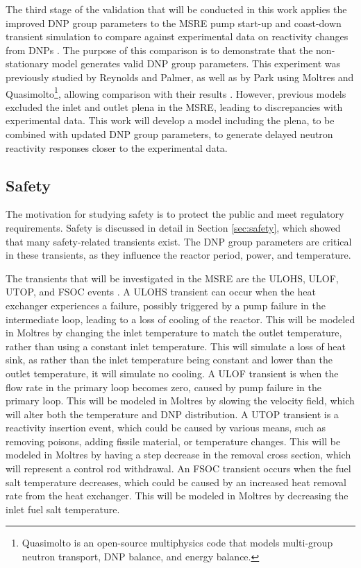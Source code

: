 The third stage of the validation that will be conducted in this work applies the improved \gls{DNP} group parameters to the \gls{MSRE} pump start-up and coast-down transient simulation to compare against experimental data on reactivity changes from \glspl{DNP} \cite{prince1968zero}.
The purpose of this comparison is to demonstrate that the non-stationary model generates valid \gls{DNP} group parameters.
This experiment was previously studied by Reynolds and Palmer, as well as by Park using Moltres and Quasimolto\footnote{Quasimolto is an open-source multiphysics code that models multi-group neutron transport, \gls{DNP} balance, and energy balance.}, allowing comparison with their results \cite{reynolds2023analysis, park_advancements_2025}.
However, previous models excluded the inlet and outlet plena in the \gls{MSRE}, leading to discrepancies with experimental data.
This work will develop a model including the plena, to be combined with updated \gls{DNP} group parameters, to generate delayed neutron reactivity responses closer to the experimental data.


\subsection{Safety}
The motivation for studying safety is to protect the public and meet regulatory requirements.
Safety is discussed in detail in Section \ref{sec:safety}, which showed that many safety-related transients exist.
The \gls{DNP} group parameters are critical in these transients, as they influence the reactor period, power, and temperature.

The transients that will be investigated in the \gls{MSRE} are the \gls{ULOHS}, \gls{ULOF}, \gls{UTOP}, and \gls{FSOC} events \cite{li2015transient, daher2022improvement}.
A \gls{ULOHS} transient can occur when the heat exchanger experiences a failure, possibly triggered by a pump failure in the intermediate loop, leading to a loss of cooling of the reactor.
This will be modeled in Moltres by changing the inlet temperature to match the outlet temperature, rather than using a constant inlet temperature.
This will simulate a loss of heat sink, as rather than the inlet temperature being constant and lower than the outlet temperature, it will simulate no cooling.
A {ULOF} transient is when the flow rate in the primary loop becomes zero, caused by pump failure in the primary loop.
This will be modeled in Moltres by slowing the velocity field, which will alter both the temperature and \gls{DNP} distribution.
A \gls{UTOP} transient is a reactivity insertion event, which could be caused by various means, such as removing poisons, adding fissile material, or temperature changes.
This will be modeled in Moltres by having a step decrease in the removal cross section, which will represent a control rod withdrawal.
An \gls{FSOC} transient occurs when the fuel salt temperature decreases, which could be caused by an increased heat removal rate from the heat exchanger.
This will be modeled in Moltres by decreasing the inlet fuel salt temperature.


